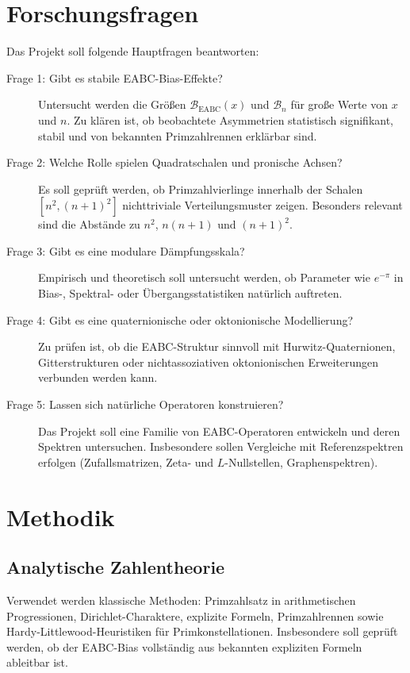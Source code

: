 \documentclass[11pt,a4paper,bibliography=totoc]{scrartcl}
\begin{document}
\section{Forschungsfragen}
Das Projekt soll folgende Hauptfragen beantworten:
\begin{description}
    \item[Frage 1: Gibt es stabile EABC-Bias-Effekte?] Untersucht werden die Größen $\mathcal{B}_{\mathrm{EABC}}(x)$ und $\mathcal{B}_n$ für große Werte von $x$ und $n$. Zu klären ist, ob beobachtete Asymmetrien statistisch signifikant, stabil und von bekannten Primzahlrennen erklärbar sind.
    \item[Frage 2: Welche Rolle spielen Quadratschalen und pronische Achsen?] Es soll geprüft werden, ob Primzahlvierlinge innerhalb der Schalen $[n^2, (n+1)^2]$ nichttriviale Verteilungsmuster zeigen. Besonders relevant sind die Abstände zu $n^2$, $n(n+1)$ und $(n+1)^2$.
    \item[Frage 3: Gibt es eine modulare Dämpfungsskala?] Empirisch und theoretisch soll untersucht werden, ob Parameter wie $e^{-\pi}$ in Bias-, Spektral- oder Übergangsstatistiken natürlich auftreten.
    \item[Frage 4: Gibt es eine quaternionische oder oktonionische Modellierung?] Zu prüfen ist, ob die EABC-Struktur sinnvoll mit Hurwitz-Quaternionen, Gitterstrukturen oder nichtassoziativen oktonionischen Erweiterungen verbunden werden kann.
    \item[Frage 5: Lassen sich natürliche Operatoren konstruieren?] Das Projekt soll eine Familie von EABC-Operatoren entwickeln und deren Spektren untersuchen. Insbesondere sollen Vergleiche mit Referenzspektren erfolgen (Zufallsmatrizen, Zeta- und $L$-Nullstellen, Graphenspektren).
\end{description}

\section{Methodik}

\subsection{Analytische Zahlentheorie}
Verwendet werden klassische Methoden: Primzahlsatz in arithmetischen Progressionen, Dirichlet-Charaktere, explizite Formeln, Primzahlrennen sowie Hardy-Littlewood-Heuristiken für Primkonstellationen. Insbesondere soll geprüft werden, ob der EABC-Bias vollständig aus bekannten expliziten Formeln ableitbar ist.
\end{document}
